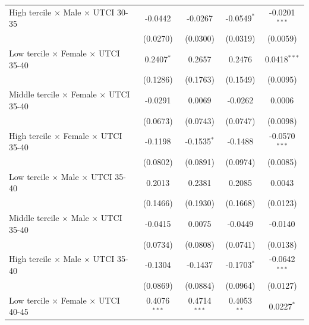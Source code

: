 \begin{table}[htbp]
\begin{tabular}{lcccc}
      High tercile $\times$ Male $\times$ UTCI 30-35       & -0.0442         & -0.0267             & -0.0549$^{*}$     & -0.0201$^{***}$\\   
                                                           & (0.0270)        & (0.0300)            & (0.0319)          & (0.0059)\\   
      Low tercile $\times$ Female $\times$ UTCI 35-40      & 0.2407$^{*}$    & 0.2657              & 0.2476            & 0.0418$^{***}$\\   
                                                           & (0.1286)        & (0.1763)            & (0.1549)          & (0.0095)\\   
      Middle tercile $\times$ Female $\times$ UTCI 35-40   & -0.0291         & 0.0069              & -0.0262           & 0.0006\\   
                                                           & (0.0673)        & (0.0743)            & (0.0747)          & (0.0098)\\   
      High tercile $\times$ Female $\times$ UTCI 35-40     & -0.1198         & -0.1535$^{*}$       & -0.1488           & -0.0570$^{***}$\\   
                                                           & (0.0802)        & (0.0891)            & (0.0974)          & (0.0085)\\   
      Low tercile $\times$ Male $\times$ UTCI 35-40        & 0.2013          & 0.2381              & 0.2085            & 0.0043\\   
                                                           & (0.1466)        & (0.1930)            & (0.1668)          & (0.0123)\\   
      Middle tercile $\times$ Male $\times$ UTCI 35-40     & -0.0415         & 0.0075              & -0.0449           & -0.0140\\   
                                                           & (0.0734)        & (0.0808)            & (0.0741)          & (0.0138)\\   
      High tercile $\times$ Male $\times$ UTCI 35-40       & -0.1304         & -0.1437             & -0.1703$^{*}$     & -0.0642$^{***}$\\   
                                                           & (0.0869)        & (0.0884)            & (0.0964)          & (0.0127)\\   
      Low tercile $\times$ Female $\times$ UTCI 40-45      & 0.4076$^{***}$  & 0.4714$^{***}$      & 0.4053$^{**}$     & 0.0227$^{*}$\\   

\end{tabular}
\end{table}
